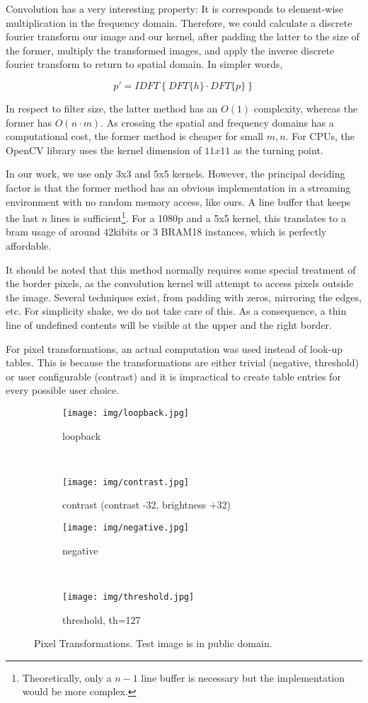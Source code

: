 Convolution has a very interesting property: It is corresponds to element-wise multiplication
in the frequency domain. Therefore, we could calculate a discrete fourier
transform our image and our kernel, after padding the latter to the size of the former,
multiply the transformed images, and apply the inverse discrete fourier transform
to return to spatial domain. In simpler words,

\[
	p' = IDFT\left\{ DFT\{h\} \cdot DFT\{p\} \right\}
\]

In respect to filter size, the latter method has an $O(1)$ complexity, 
whereas the former has $O(n\cdot m)$. As crossing the spatial and frequency domains
has a computational cost, the former method is cheaper for small $m,n$.
For CPUs, the OpenCV library uses the kernel dimension of $11x11$ as the turning point.

In our work, we use only 3x3 and 5x5 kernels. However, the principal deciding factor
is that the former method has an obvious implementation in a streaming environment
with no random memory access, like ours. A line buffer that keeps the last $n$ lines
is sufficient\footnote{Theoretically, only a $n-1$ line buffer is necessary but the
implementation would be more complex.}. For a 1080p and a 5x5 kernel, this translates
to a \gls{bram} usage of around 42kibits or 3 BRAM18 instances, which is perfectly affordable.

It should be noted that this method normally requires some special treatment of the
border pixels, as the convolution kernel will attempt to access pixels outside the image.
Several techniques exist, from padding with zeros, mirroring the edges, etc.
For simplicity shake, we do not take care of this. As a consequence, a thin line 
of undefined contents will be visible at the upper and the right border.

For pixel transformations, an actual computation was used instead of look-up tables.
This is because the transformations are either trivial (negative, threshold) or
user configurable (contrast) and it is impractical to create table entries for every possible
user choice.

\begin{figure}[tb!]
\centering
\begin{subfigure}[b]{.49\linewidth}
	\texttt{[image: img/loopback.jpg]}
	\caption{loopback}
\end{subfigure}
~
\begin{subfigure}[b]{.49\linewidth}
	\texttt{[image: img/contrast.jpg]}
	\caption{contrast (contrast -32, brightness +32)}
\end{subfigure}
\par\bigskip
\begin{subfigure}[b]{.49\linewidth}
	\texttt{[image: img/negative.jpg]}
	\caption{negative}
\end{subfigure}
~
\begin{subfigure}[b]{.49\linewidth}
	\texttt{[image: img/threshold.jpg]}
	\caption{threshold, th=127}
\end{subfigure}
\caption{Pixel Transformations. Test image is in public domain.}
\label{fig:pixel-transformations}
\end{figure}

